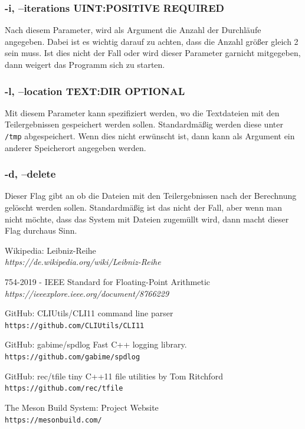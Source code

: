 \documentclass[12pt]{article}
\begin{document}
\subsubsection{-i, --iterations UINT:POSITIVE REQUIRED}
Nach diesem Parameter, wird als Argument die Anzahl der Durchläufe angegeben.
Dabei ist es wichtig darauf zu achten, dass die Anzahl größer gleich 2 sein 
muss. Ist dies nicht der Fall oder wird dieser Parameter garnicht mitgegeben, 
dann weigert das Programm sich zu starten.
\subsubsection{-l, --location TEXT:DIR OPTIONAL}
Mit diesem Parameter kann spezifiziert werden, wo die Textdateien mit den
Teilergebnissen gespeichert werden sollen. Standardmäßig werden diese unter
\texttt{/tmp} abgespeichert. Wenn dies nicht erwünscht ist, dann kann als
Argument ein anderer Speicherort angegeben werden.
\subsubsection{-d, --delete}
Dieser Flag gibt an ob die Dateien mit den Teilergebnissen nach der Berechnung
gelöscht werden sollen. Standardmäßig ist das nicht der Fall, aber wenn man
nicht möchte, dass das System mit Dateien zugemüllt wird, dann macht dieser 
Flag durchaus Sinn.

\begin{thebibliography}{5}
Wikipedia: Leibniz-Reihe
\\\textit{https://de.wikipedia.org/wiki/Leibniz-Reihe}

754-2019 - IEEE Standard for Floating-Point Arithmetic
\\\textit{https://ieeexplore.ieee.org/document/8766229}

GitHub: CLIUtils/CLI11 command line parser
\\\texttt{https://github.com/CLIUtils/CLI11}

GitHub:  gabime/spdlog Fast C++ logging library. 
\\\texttt{https://github.com/gabime/spdlog}

GitHub: rec/tfile tiny C++11 file utilities by Tom Ritchford
\\\texttt{https://github.com/rec/tfile}

The Meson Build System: Project Website
\\\texttt{https://mesonbuild.com/}

\end{thebibliography}
\end{document}
